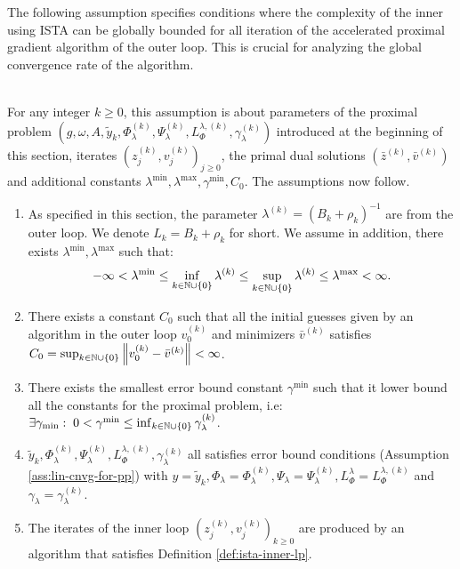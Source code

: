 \documentclass[12pt]{article}
\begin{document}
        \par
        The following assumption specifies conditions where the complexity of the inner using ISTA can be globally bounded for all iteration of the accelerated proximal gradient algorithm of the outer loop. 
        This is crucial for analyzing the global convergence rate of the algorithm. 
        \begin{assumption}\;\label{ass:bounded-inn-cmplx}\\
            For any integer $k \ge 0$, this assumption is about parameters of the proximal problem $\left(g, \omega, A, \tilde y_k, \Phi_\lambda^{(k)}, \Psi_\lambda^{(k)}, L^{\lambda, (k)}_{\Phi} ,\gamma_\lambda^{(k)}\right)$ introduced at the beginning of this section, iterates $\left(z_j^{(k)}, v_j^{(k)}\right)_{j\ge0}$, the primal dual solutions $\left(\bar z^{(k)}, \bar v^{(k)}\right)$ and additional constants $\lambda^{\min}, \lambda^{\max}, \gamma^{\min}, C_0$. 
            The assumptions now follow. 
            \begin{enumerate}[nosep]
                \item As specified in this section, the parameter $\lambda^{(k)} = (B_k + \rho_k)^{-1}$ are from the outer loop. We denote $L_k = B_k + \rho_k$ for short. We assume in addition, there exists $\lambda^{\min}, \lambda^{\max}$ such that: 
                $$
                    - \infty < \lambda^{\min} \le \inf_{k \in \mathbb N \cup \{0\}} \lambda^{(k)} \le \sup_{k \in \mathbb N \cup \{0\}} \lambda^{(k)} \le \lambda^{\max} < \infty. 
                $$ 
                \item There exists a constant $C_0$ such that all the initial guesses given by an algorithm in the outer loop $v_0^{(k)}$ and minimizers $\bar v^{(k)}$ satisfies $C_0 = \sup_{k \in \mathbb N \cup \{0\}}\left\Vert v_0^{(k)} - \bar v^{(k)}\right\Vert < \infty$. 
                \item There exists the smallest error bound constant $\gamma^{\min}$ such that it lower bound all the constants for the proximal problem, i.e: $\exists \gamma_{\min}:\;0 < \gamma^{\min} \le \inf_{k \in \mathbb N \cup \{0\}} \gamma^{(k)}_\lambda$. 
                \item $\tilde y_k, \Phi_\lambda^{(k)}, \Psi_\lambda^{(k)}, L^{\lambda, (k)}_{\Phi} ,\gamma_\lambda^{(k)}$ all satisfies error bound conditions (Assumption \ref{ass:lin-cnvg-for-pp}) with $y = \tilde y_k, \Phi_\lambda = \Phi_\lambda^{(k)}, \Psi_\lambda = \Psi_\lambda^{(k)}, L_\Phi^\lambda = L^{\lambda, (k)}_{\Phi}$ and $\gamma_\lambda = \gamma_\lambda^{(k)}$. 
                \item The iterates of the inner loop $(z_j^{(k)}, v_j^{(k)})_{k \ge 0}$ are produced by an algorithm that satisfies Definition \ref{def:ista-inner-lp}. 
            \end{enumerate}
        \end{assumption}
\end{document}

